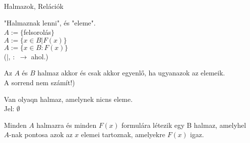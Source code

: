 

\begin{frame}[plain]
\begin{tcolorbox}[center, colback={myyellow}, coltext={black}, colframe={myyellow}]
    {\Huge Halmazok, Relációk}
    \mmedskip
\end{tcolorbox}
\end{frame}

\begin{frame}
\begin{tcolorbox}[title={Def.: A halmazelmélet "Definiálatlan alapfogalmai"}]
"Halmaznak lenni", és "eleme".\\
$A := \{$felsorolás$\}$\\
$A := \{ x \in B | F(x) \}$\\
$A := \{ x \in B : F(x) \}$\\
{\footnotesize ($|$, $:$ $\rightarrow$ ahol.)}
\end{tcolorbox}

\begin{tcolorbox}[title={Def.:  Meghatározottsági Axióma (Halmazok egyenlősége)}]
Az $A$ és $B$ halmaz akkor és csak akkor egyenlő, ha ugyanazok az elemeik.\\
{\footnotesize A sorrend nem számít!)}
\end{tcolorbox}

\begin{tcolorbox}[title={Def.: Az üres halmz axiómája}]
Van olyaqn halmaz, amelynek nicns eleme.\\
Jel: $\emptyset$
\end{tcolorbox}

\begin{tcolorbox}[title={Def.: Részhalmaz-axióma}]
Minden $A$ halmazra és minden $F(x)$ formulára létezik egy B halmaz, amelyhel $A$-nak pontosa azok az $x$ elemei tartoznak, amelyekre $F(x)$ igaz.
\end{tcolorbox}
\end{frame}

